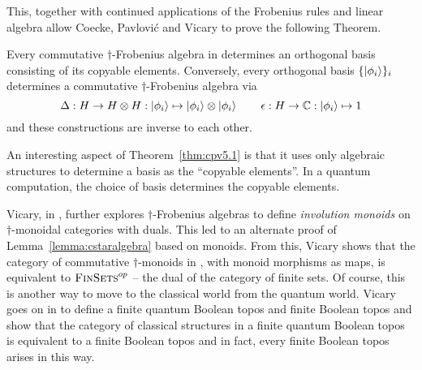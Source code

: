This, together with continued applications of the Frobenius rules and linear algebra allow Coecke,
Pavlovi\'c and Vicary to prove the following Theorem.
\begin{theorem}\label{thm:cpv5.1}
  Every commutative $\dagger$-Frobenius algebra in \fdh determines an orthogonal basis consisting
  of its copyable elements. Conversely, every orthogonal basis $\{\left\vert{\phi_{i}}\right\rangle\}_{i}$ determines
  a commutative $\dagger$-Frobenius algebra via \[\Delta:H\to H\otimes H: \left\vert{\phi_{i}}\right\rangle\mapsto
  \left\vert{\phi_{i}}\right\rangle \otimes \left\vert{\phi_{i}}\right\rangle\qquad\epsilon : H\to \mathbb{C} : \left\vert{\phi_{i}}\right\rangle \mapsto 1\] and these
  constructions are inverse to each other.
\end{theorem}

An interesting aspect of Theorem~\ref{thm:cpv5.1} is that it uses only algebraic structures to
determine a basis as the ``copyable elements''. In a quantum computation, the choice of basis
determines the copyable elements.

\begin{remark}
  Vicary, in \cite{vicary2011categorical}, further explores $\dagger$-Frobenius algebras to define
  \emph{involution monoids} on $\dagger$-monoidal categories with duals. This led to an alternate
  proof of Lemma~\ref{lemma:cstaralgebra} based on monoids. From this, Vicary shows that
  the category of commutative $\dagger$-monoids in \fdh, with monoid morphisms as maps, is equivalent
  to ${\textsc{FinSets}}^{op}$ -- the dual of the category of finite sets. Of course, this is another way to
  move to the classical world from the quantum world.  Vicary goes on in
  \cite{mclarty1992elementary} to define a finite quantum Boolean topos and finite Boolean topos and
  show that the category of classical structures in a finite quantum Boolean topos is equivalent to
  a finite Boolean topos and in fact, every finite Boolean topos arises in this way.
\end{remark}

